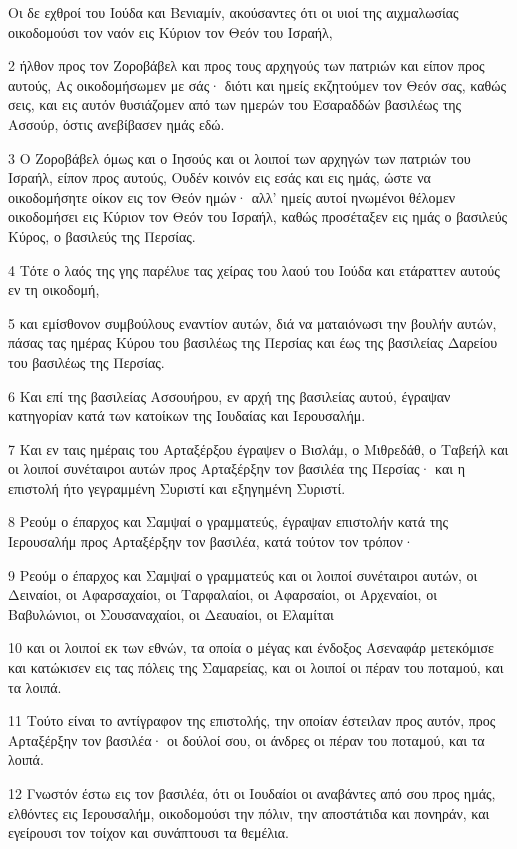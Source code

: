 \par Οι δε εχθροί του Ιούδα και Βενιαμίν, ακούσαντες ότι οι υιοί της αιχμαλωσίας οικοδομούσι τον ναόν εις Κύριον τον Θεόν του Ισραήλ,
\par 2 ήλθον προς τον Ζοροβάβελ και προς τους αρχηγούς των πατριών και είπον προς αυτούς, Ας οικοδομήσωμεν με σάς· διότι και ημείς εκζητούμεν τον Θεόν σας, καθώς σεις, και εις αυτόν θυσιάζομεν από των ημερών του Εσαραδδών βασιλέως της Ασσούρ, όστις ανεβίβασεν ημάς εδώ.
\par 3 Ο Ζοροβάβελ όμως και ο Ιησούς και οι λοιποί των αρχηγών των πατριών του Ισραήλ, είπον προς αυτούς, Ουδέν κοινόν εις εσάς και εις ημάς, ώστε να οικοδομήσητε οίκον εις τον Θεόν ημών· αλλ' ημείς αυτοί ηνωμένοι θέλομεν οικοδομήσει εις Κύριον τον Θεόν του Ισραήλ, καθώς προσέταξεν εις ημάς ο βασιλεύς Κύρος, ο βασιλεύς της Περσίας.
\par 4 Τότε ο λαός της γης παρέλυε τας χείρας του λαού του Ιούδα και ετάραττεν αυτούς εν τη οικοδομή,
\par 5 και εμίσθονον συμβούλους εναντίον αυτών, διά να ματαιόνωσι την βουλήν αυτών, πάσας τας ημέρας Κύρου του βασιλέως της Περσίας και έως της βασιλείας Δαρείου του βασιλέως της Περσίας.
\par 6 Και επί της βασιλείας Ασσουήρου, εν αρχή της βασιλείας αυτού, έγραψαν κατηγορίαν κατά των κατοίκων της Ιουδαίας και Ιερουσαλήμ.
\par 7 Και εν ταις ημέραις του Αρταξέρξου έγραψεν ο Βισλάμ, ο Μιθρεδάθ, ο Ταβεήλ και οι λοιποί συνέταιροι αυτών προς Αρταξέρξην τον βασιλέα της Περσίας· και η επιστολή ήτο γεγραμμένη Συριστί και εξηγημένη Συριστί.
\par 8 Ρεούμ ο έπαρχος και Σαμψαί ο γραμματεύς, έγραψαν επιστολήν κατά της Ιερουσαλήμ προς Αρταξέρξην τον βασιλέα, κατά τούτον τον τρόπον·
\par 9 Ρεούμ ο έπαρχος και Σαμψαί ο γραμματεύς και οι λοιποί συνέταιροι αυτών, οι Δειναίοι, οι Αφαρσαχαίοι, οι Ταρφαλαίοι, οι Αφαρσαίοι, οι Αρχεναίοι, οι Βαβυλώνιοι, οι Σουσαναχαίοι, οι Δεαυαίοι, οι Ελαμίται
\par 10 και οι λοιποί εκ των εθνών, τα οποία ο μέγας και ένδοξος Ασεναφάρ μετεκόμισε και κατώκισεν εις τας πόλεις της Σαμαρείας, και οι λοιποί οι πέραν του ποταμού, και τα λοιπά.
\par 11 Τούτο είναι το αντίγραφον της επιστολής, την οποίαν έστειλαν προς αυτόν, προς Αρταξέρξην τον βασιλέα· οι δούλοί σου, οι άνδρες οι πέραν του ποταμού, και τα λοιπά.
\par 12 Γνωστόν έστω εις τον βασιλέα, ότι οι Ιουδαίοι οι αναβάντες από σου προς ημάς, ελθόντες εις Ιερουσαλήμ, οικοδομούσι την πόλιν, την αποστάτιδα και πονηράν, και εγείρουσι τον τοίχον και συνάπτουσι τα θεμέλια.
